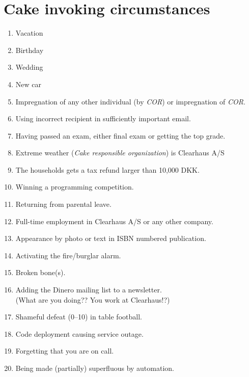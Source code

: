 \documentclass[a4paper, oneside, article]{memoir}
\newcounter{tbc}
\begin{document}
\chapter{Cake invoking circumstances}
\label{chp:circumstances}
\begin{enumerate}[§ 1]
  \setcounter{enumi}{\value{tbc}}

  \item Vacation
  \item Birthday
  \item Wedding
  \item New car
  \item Impregnation of any other individual (by \emph{COR}) or impregnation of
    \emph{COR}.
  \item Using incorrect recipient in sufficiently important email.
  \item Having passed an exam, either final exam or getting the top grade.
  \item Extreme weather (\emph{Cake responsible organization}) is Clearhaus A/S
  \item The households gets a tax refund larger than 10,000 DKK\@.
  \item Winning a programming competition.
  \item Returning from parental leave.
  \item Full-time employment in Clearhaus A/S or any other company.
  \item Appearance by photo or text in ISBN numbered publication.
  \item Activating the fire/burglar alarm.
  \item Broken bone(s).
  \item Adding the Dinero mailing list to a newsletter.\\
    {\tiny (What are you doing?? You work at Clearhaus!?)}
  \item Shameful defeat (0--10) in table football.
  \item Code deployment causing service outage.
  \item Forgetting that you are on call.
  \item Being made (partially) superfluous by automation.
\end{enumerate}
\end{document}

